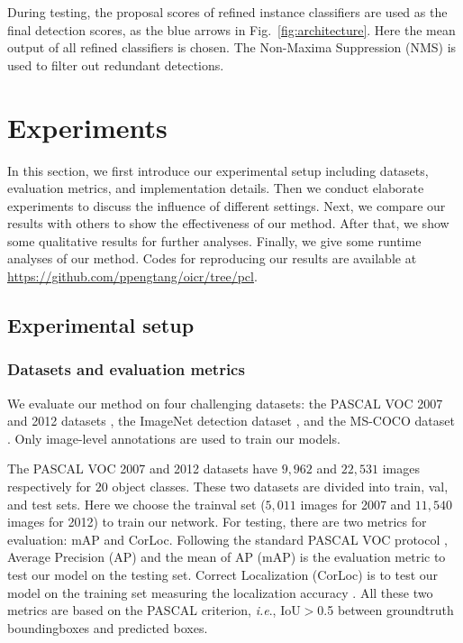 \documentclass[10pt,journal,compsoc]{IEEEtran}
\def\ie{\emph{i.e}.} \def\Ie{\emph{I.e}.}
\begin{document}
During testing,
the proposal scores of refined instance classifiers are used as the final detection scores,
as the blue arrows in Fig.~\ref{fig:architecture}.
Here the mean output of all refined classifiers is chosen.
The Non-Maxima Suppression (NMS) is used to filter out redundant detections.



\section{Experiments}
\label{sec:exp}

In this section, we first introduce our experimental setup including datasets, evaluation metrics, and implementation details.
Then we conduct elaborate experiments to discuss the influence of different settings.
Next, we compare our results with others to show the effectiveness of our method.
After that, we show some qualitative results for further analyses.
{Finally, we give some runtime analyses of our method.
Codes for reproducing our results are available at \url{https://github.com/ppengtang/oicr/tree/pcl}.}


\subsection{Experimental setup}
\label{sec:exp_setup}


\subsubsection{Datasets and evaluation metrics}
We evaluate our method on four challenging datasets: the PASCAL VOC 2007 and 2012 datasets \cite{Ref:Everingham2015}, the ImageNet detection dataset \cite{Ref:Russakovsky2015}, {and the MS-COCO dataset \cite{Ref:Lin2014}}.
Only image-level annotations are used to train our models.

The PASCAL VOC 2007 and 2012 datasets have $9,962$ and $22,531$ images respectively for $20$ object classes.
These two datasets are divided into train, val, and test sets.
Here we choose the trainval set ($5,011$ images for 2007 and $11,540$ images for 2012) to train our network.
For testing, there are two metrics for evaluation: mAP and CorLoc.
Following the standard PASCAL VOC protocol \cite{Ref:Everingham2015},
Average Precision (AP) and the mean of AP (mAP) is the evaluation metric to test our model on the testing set.
Correct Localization (CorLoc) is to test our model on the training set measuring the localization accuracy \cite{Ref:Deselaers2012}.
All these two metrics are based on the PASCAL criterion, \ie, IoU$>$0.5 between groundtruth boundingboxes and predicted boxes.
\end{document}
